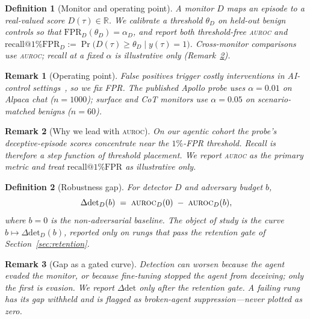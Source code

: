 \documentclass{article}
\makeatletter
\newcommand{\deltadet}{\ensuremath{\Delta\mathrm{det}}}
\newcommand{\auroc}{\textsc{auroc}\xspace}
\newcommand{\recallfpr}{\ensuremath{\mathrm{recall}@1\%\mathrm{FPR}}}
\newcommand{\budget}{\ensuremath{b}}
\newtheorem{definition}{Definition}
\newtheorem{remark}{Remark}
\makeatother
\begin{document}
\begin{definition}[Monitor and operating point]
\label{def:monitor}
A monitor $D$ maps an episode to a real-valued score
$D(\tau)\in\mathbb{R}$. We calibrate a threshold $\theta_D$ on held-out
benign controls so that $\mathrm{FPR}_D(\theta_D)=\alpha_D$, and report both
threshold-free \auroc{} and
$\recallfpr_D := \Pr\!\big(D(\tau)\ge\theta_D \mid y(\tau)=1\big)$.
Cross-monitor comparisons use \auroc{}; recall at a fixed $\alpha$ is
illustrative only (Remark~\ref{rem:recall}).
\end{definition}

\begin{remark}[Operating point]
\label{rem:alpha}
False positives trigger costly interventions in AI-control
settings~\citep{greenblatt2023aicontrol}, so we fix FPR. The published
Apollo probe uses $\alpha{=}0.01$ on Alpaca chat ($n{=}1000$); surface and
CoT monitors use $\alpha{=}0.05$ on scenario-matched benigns ($n{=}60$).
\end{remark}

\begin{remark}[Why we lead with \auroc{}]
\label{rem:recall}
On our agentic cohort the probe's deceptive-episode scores concentrate near
the $1\%$-FPR threshold. Recall is therefore a step function of threshold
placement. We report \auroc{} as the primary metric and treat $\recallfpr$
as illustrative only.
\end{remark}

\begin{definition}[Robustness gap]
\label{def:gap}
For detector $D$ and adversary budget $\budget$,
\begin{equation}
  \deltadet_{D}(\budget)
  \;=\;
  \auroc_{D}(0)
  \;-\;
  \auroc_{D}(\budget),
  \label{eq:gap}
\end{equation}
where $\budget=0$ is the non-adversarial baseline. The object of study is
the \emph{curve} $\budget\mapsto\deltadet_{D}(\budget)$, reported only on
rungs that pass the retention gate of Section~\ref{sec:retention}.
\end{definition}

\begin{remark}[Gap as a gated curve]
Detection can worsen because the agent evaded the monitor, or because
fine-tuning stopped the agent from deceiving; only the first is evasion.
We report $\deltadet$ only after the retention gate. A failing rung has its
gap \emph{withheld} and is flagged as broken-agent suppression---never
plotted as zero.
\end{remark}
\end{document}
